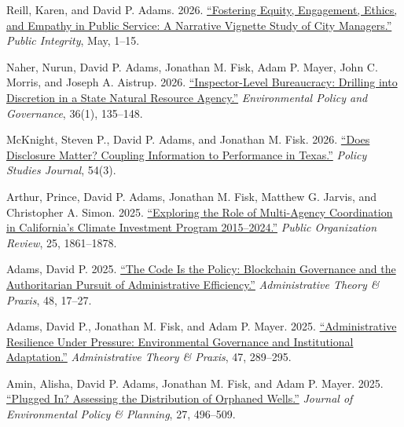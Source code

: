 \documentclass[11pt,letterpaper]{article}
\renewenvironment{itemize}{
  \begin{list}{}{
    \setlength{\leftmargin}{1.5em}
    \setlength{\itemsep}{0.25em}
    \setlength{\parskip}{0pt}
    \setlength{\parsep}{0.25em}
  }
}{
  \end{list}
}
\begin{document}
\begin{itemize}\leftmargin=2pt\itemindent=-15pt\leftmargin=2pt\itemindent=-15pt

    \item Reill, Karen, and David P. Adams. 2026. \href{https://doi.org/10.1080/10999922.2026.2665006}{``Fostering Equity, Engagement, Ethics, and Empathy in Public Service: A Narrative Vignette Study of City Managers.''} \emph{Public Integrity}, May, 1--15.

    \item Naher, Nurun, David P. Adams, Jonathan M. Fisk, Adam P. Mayer, John C. Morris, and Joseph A. Aistrup. 2026. \href{https://doi.org/10.1002/eet.70038}{``Inspector-Level Bureaucracy: Drilling into Discretion in a State Natural Resource Agency.''} \emph{Environmental Policy and Governance}, 36(1), 135--148.

    \item McKnight, Steven P., David P. Adams, and Jonathan M. Fisk. 2026. \href{https://doi.org/10.1111/psj.70064}{``Does Disclosure Matter? Coupling Information to Performance in Texas.''} \emph{Policy Studies Journal}, 54(3).

    \item Arthur, Prince, David P. Adams, Jonathan M. Fisk, Matthew G. Jarvis, and Christopher A. Simon. 2025. \href{https://doi.org/10.1007/s11115-025-00958-2}{``Exploring the Role of Multi-Agency Coordination in California's Climate Investment Program 2015--2024.''} \emph{Public Organization Review}, 25, 1861--1878.

    \item Adams, David P. 2025. \href{https://doi.org/10.1080/10841806.2025.2585729}{``The Code Is the Policy: Blockchain Governance and the Authoritarian Pursuit of Administrative Efficiency.''} \emph{Administrative Theory \& Praxis}, 48, 17--27.

    \item Adams, David P., Jonathan M. Fisk, and Adam P. Mayer. 2025. \href{https://doi.org/10.1080/10841806.2025.2537600}{``Administrative Resilience Under Pressure: Environmental Governance and Institutional Adaptation.''} \emph{Administrative Theory \& Praxis}, 47, 289--295.

    \item Amin, Alisha, David P. Adams, Jonathan M. Fisk, and Adam P. Mayer. 2025. \href{https://doi.org/10.1080/1523908X.2025.2480289}{``Plugged In? Assessing the Distribution of Orphaned Wells.''} \emph{Journal of Environmental Policy \& Planning}, 27, 496--509.


\end{itemize}
\end{document}
